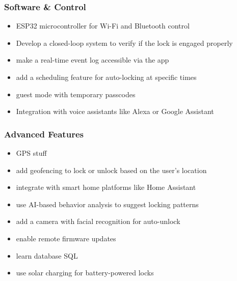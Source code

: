 \subsubsection{Software \& Control}
\begin{itemize}
    \item ESP32 microcontroller for Wi-Fi and Bluetooth control
    \item Develop a closed-loop system to verify if the lock is engaged properly
    \item make a real-time event log accessible via the app
    \item add a scheduling feature for auto-locking at specific times
    \item guest mode with temporary passcodes
    \item Integration with voice assistants like Alexa or Google Assistant
\end{itemize}

\subsubsection{Advanced Features}
\begin{itemize}
    \item GPS stuff
    \item add geofencing to lock or unlock based on the user's location
    \item integrate with smart home platforms like Home Assistant
    \item use AI-based behavior analysis to suggest locking patterns
    \item add a camera with facial recognition for auto-unlock
    \item enable remote firmware updates
    \item learn database SQL
    \item use solar charging for battery-powered locks
\end{itemize}
